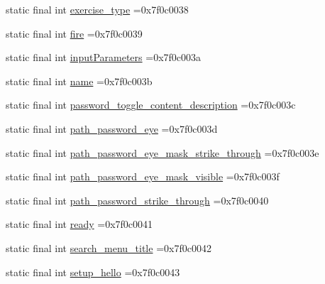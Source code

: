 \begin{DoxyCompactItemize}
\item 
static final int \mbox{\hyperlink{classcom_1_1example_1_1trainawearapplication_1_1_r_1_1string_a91aed1c6003d2b52b1c2dfff0e868810}{exercise\+\_\+type}} =0x7f0c0038
\item 
static final int \mbox{\hyperlink{classcom_1_1example_1_1trainawearapplication_1_1_r_1_1string_aa14a249c1bcd4878110a4705110a2bf3}{fire}} =0x7f0c0039
\item 
static final int \mbox{\hyperlink{classcom_1_1example_1_1trainawearapplication_1_1_r_1_1string_a85897c609a8125b0c5dbfcaa959ba1d2}{input\+Parameters}} =0x7f0c003a
\item 
static final int \mbox{\hyperlink{classcom_1_1example_1_1trainawearapplication_1_1_r_1_1string_ad91e7999c9f01ad8a9f72a7bc1ace2a5}{name}} =0x7f0c003b
\item 
static final int \mbox{\hyperlink{classcom_1_1example_1_1trainawearapplication_1_1_r_1_1string_a1debe9a392f86756a179f87397b7a5b4}{password\+\_\+toggle\+\_\+content\+\_\+description}} =0x7f0c003c
\item 
static final int \mbox{\hyperlink{classcom_1_1example_1_1trainawearapplication_1_1_r_1_1string_a8bbe2b4b3616e88d38ef71172f30bc23}{path\+\_\+password\+\_\+eye}} =0x7f0c003d
\item 
static final int \mbox{\hyperlink{classcom_1_1example_1_1trainawearapplication_1_1_r_1_1string_a01822219ad0253fe594b489945be5dbf}{path\+\_\+password\+\_\+eye\+\_\+mask\+\_\+strike\+\_\+through}} =0x7f0c003e
\item 
static final int \mbox{\hyperlink{classcom_1_1example_1_1trainawearapplication_1_1_r_1_1string_a35a794f68d71ef14b04230c1458e975e}{path\+\_\+password\+\_\+eye\+\_\+mask\+\_\+visible}} =0x7f0c003f
\item 
static final int \mbox{\hyperlink{classcom_1_1example_1_1trainawearapplication_1_1_r_1_1string_ab13e3044338d483645d4506aab71553a}{path\+\_\+password\+\_\+strike\+\_\+through}} =0x7f0c0040
\item 
static final int \mbox{\hyperlink{classcom_1_1example_1_1trainawearapplication_1_1_r_1_1string_ad64d021989290e5286c75d5a99207946}{ready}} =0x7f0c0041
\item 
static final int \mbox{\hyperlink{classcom_1_1example_1_1trainawearapplication_1_1_r_1_1string_a4891cf138ed35294ed3d34845ff7dfd0}{search\+\_\+menu\+\_\+title}} =0x7f0c0042
\item 
static final int \mbox{\hyperlink{classcom_1_1example_1_1trainawearapplication_1_1_r_1_1string_ace82846c251085416d87a2f89649aa32}{setup\+\_\+hello}} =0x7f0c0043

\end{DoxyCompactItemize}
